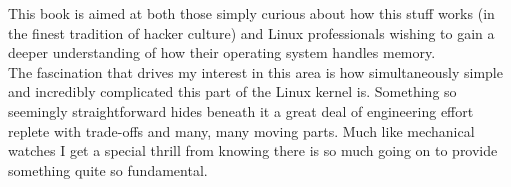 This book is aimed at both those simply curious about how this stuff works (in
the finest tradition of hacker culture) and Linux professionals wishing to gain
a deeper understanding of how their operating system handles memory.\\


The fascination that drives my interest in this area is how simultaneously
simple and incredibly complicated this part of the Linux kernel is. Something so
seemingly straightforward hides beneath it a great deal of engineering effort
replete with trade-offs and many, many moving parts. Much like mechanical
watches I get a special thrill from knowing there is so much going on to provide
something quite so fundamental.\\
